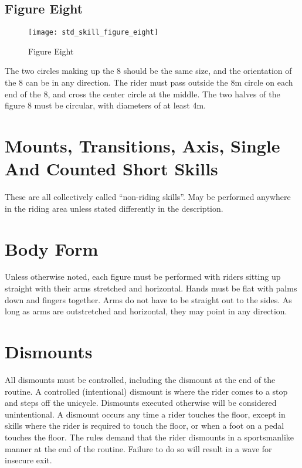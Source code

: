 \subsection{Figure Eight}
\begin{wrapfigure}{r}{0.35\textwidth}
\vspace{-45pt}
\begin{center}
\texttt{[image: std\_skill\_figure\_eight]}
\end{center}
\vspace{-20pt}
\caption{Figure Eight\label{fig:std_skill_figure_eight}}
\vspace{-10pt}
\end{wrapfigure}
The two circles making up the 8 should be the same size, and the orientation of the 8 can be in any direction.
The rider must pass outside the 8m circle on each end of the 8, and cross the center circle at the middle.
The two halves of the figure 8 must be circular, with diameters of at least 4m.

\section{Mounts, Transitions, Axis, Single And Counted Short Skills}
These are all collectively called ``non-riding skills''.
May be performed anywhere in the riding area unless stated differently in the description.

\section{Body Form}
Unless otherwise noted, each figure must be performed with riders sitting up straight with their arms stretched and horizontal.
Hands must be flat with palms down and fingers together.
Arms do not have to be straight out to the sides.
As long as arms are outstretched and horizontal, they may point in any direction.

\section{Dismounts}
All dismounts must be controlled, including the dismount at the end of the routine.
A controlled (intentional) dismount is where the rider comes to a stop and steps off the unicycle.
Dismounts executed otherwise will be considered unintentional.
A dismount occurs any time a rider touches the floor, except in skills where the rider is required to touch the floor, or when a foot on a pedal touches the floor.
The rules demand that the rider dismounts in a sportsmanlike manner at the end of the routine.
Failure to do so will result in a wave for insecure exit.

